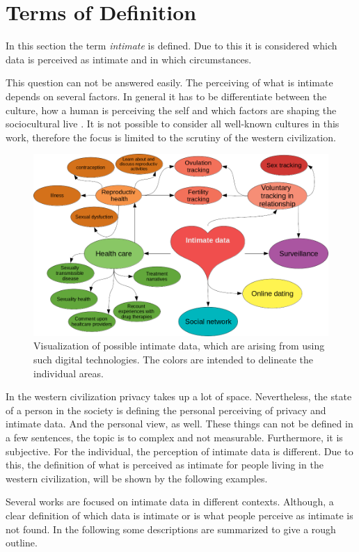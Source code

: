 \section{Terms of Definition}
\label{sec:terms_of_definition}
In this section the term \textit{intimate} is defined. Due to this it is considered which data is perceived as intimate and in which circumstances.

This question can not be answered easily. The perceiving of what is intimate depends on several factors.
In general it has to be differentiate between the culture, how a human is perceiving the self and which factors are shaping the sociocultural live \cite{carrithers1985category}. It is not possible to consider all well-known cultures in this work, therefore the focus is limited to the scrutiny of the western civilization. 
\begin{figure}[htb]
	\centering
	\includegraphics[width=\linewidth]{img/cluster_heart.png}
	\caption{Visualization of possible intimate data, which are arising from using such digital technologies. The colors are intended to delineate the individual areas.}
	\label{fig:cluster}
\end{figure}
In the western civilization privacy takes up a lot of space. Nevertheless, the state of a person in the society is defining the personal perceiving of privacy and intimate data. And the personal view, as well.
These things can not be defined in a few sentences, the topic is to complex and not measurable. Furthermore, it is subjective. For the individual, the perception of intimate data is different. Due to this, the definition of what is perceived as intimate for people living in the western civilization, will be shown by the following examples.

Several works are focused on intimate data in different contexts. Although, a clear definition of which data is intimate or is what people perceive as intimate is not found.
In the following some descriptions are summarized to give a rough outline.


